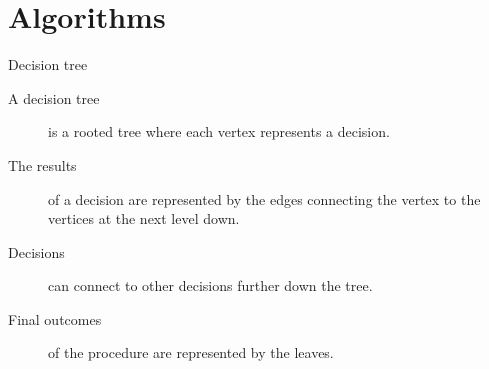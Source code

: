
\section{Algorithms}

\begin{frame}{Decision tree}
  \begin{description}
    \item[A decision tree] is a rooted tree where each vertex represents a decision.
    \vspace{4mm}
    \item[The results] of a decision are represented by the edges connecting the vertex to the vertices at the next level down.
    \vspace{4mm}
    \item[Decisions] can connect to other decisions further down the tree.
    \vspace{4mm}
    \item[Final outcomes] of the procedure are represented by the leaves.
  \end{description}
\end{frame}



